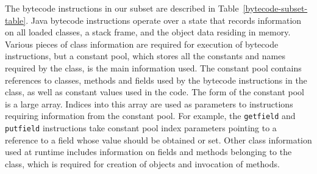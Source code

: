 The bytecode instructions in our subset are described in
Table~\ref{bytecode-subset-table}.
Java bytecode instructions operate over a state that records
information on all loaded classes, a stack frame, and the object data
residing in memory.
Various pieces of class information are required for execution of
bytecode instructions, but a constant pool, which stores all the
constants and names required by the class, is the main information
used.
The constant pool contains references to classes, methods and fields
used by the bytecode instructions in the class, as well as constant
values used in the code.
The form of the constant pool is a large array.
Indices into this array are used as parameters to instructions
requiring information from the constant pool.
For example, the \texttt{getfield} and \texttt{putfield} instructions
take constant pool index parameters pointing to a reference to a field
whose value should be obtained or set.
Other class information used at runtime includes information on fields
and methods belonging to the class, which is required for creation of
objects and invocation of methods.

